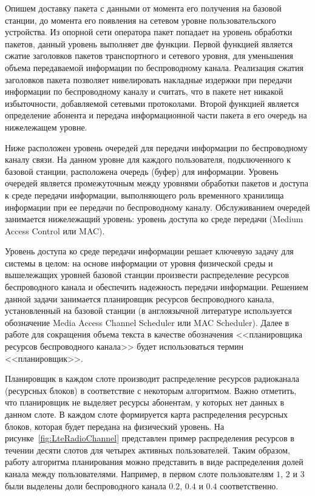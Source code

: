 Опишем доставку пакета с данными от момента его получения на базовой станции, до момента его появления на сетевом уровне пользовательского устройства. Из опорной сети оператора пакет попадает на уровень обработки пакетов, данный уровень выполняет две функции. Первой функцией является сжатие заголовков пакетов транспортного и сетевого уровня, для уменьшения объема передаваемой информации по беспроводному канала. Реализация сжатия заголовков пакета позволяет нивелировать накладные издержки при передачи информации по беспроводному каналу и считать, что в пакете нет никакой избыточности, добавляемой сетевыми протоколами. Второй функцией является определение абонента и передача информационной части пакета в его очередь на нижележащем уровне.

Ниже расположен уровень очередей для передачи информации по беспроводному каналу связи. На данном уровне для каждого пользователя, подключенного к базовой станции, расположена очередь (буфер) для информации. Уровень очередей является промежуточным между уровнями обработки пакетов и доступа к среде передачи информации, выполняющего роль временного хранилища информации при ее передачи по беспроводному каналу. Обслуживанием очередей занимается нижележащий уровень: уровень доступа ко среде передачи (Medium Access Control или MAC).

Уровень доступа ко среде передачи информации решает ключевую задачу для системы в целом: на основе информации от уровня физической среды и вышележащих уровней базовой станции произвести распределение ресурсов беспроводного канала и обеспечить надежность передачи информации. Решением данной задачи занимается планировщик ресурсов беспроводного канала, установленный на базовой станции (в англоязычной литературе используется обозначение Media Access Channel Scheduler или MAC Scheduler). Далее в работе для сокращения объема текста в качестве обозначения <<планировщика ресурсов беспроводного канала>> будет использоваться термин <<планировщик>>.

Планировщик в каждом слоте производит распределение ресурсов радиоканала (ресурсных блоков) в соответствие с некоторым алгоритмом. Важно отметить, что планировщик не выделяет ресурсы абонентам, у которых нет данных в данном слоте. В каждом слоте формируется карта распределения ресурсных блоков, которая будет передана на физический уровень. На рисунке~\ref{fig:LteRadioChannel} представлен пример распределения ресурсов в течении десяти слотов для четырех активных пользователей. Таким образом, работу алгоритма планирования можно представить в виде распределения долей канала между пользователями. Например, в первом слоте пользователям $1$, $2$ и $3$ были выделены доли беспроводного канала $0.2$, $0.4$ и $0.4$ соответственно.

